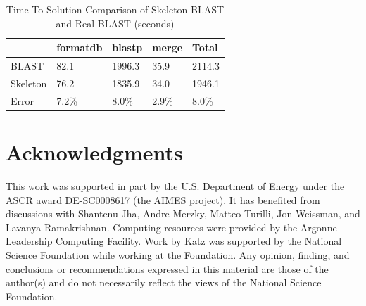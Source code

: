 \documentclass{sig-alternate}
\newcommand{\up}{\vspace*{-1em}}
\begin{document}
\begin{table}[t]
\begin{center}
    \caption{Time-To-Solution Comparison of Skeleton BLAST and Real BLAST (seconds)}
    \begin{scriptsize}
    \begin{tabular}{ | p{1cm} | p{1cm} | p{1cm} | p{1.2cm} | p{1cm} | }
    \hline
	& formatdb & blastp & merge & Total \\ \hline \hline
	BLAST & 82.1 & 1996.3 & 35.9 & 2114.3 \\ \hline
	Skeleton & 76.2 & 1835.9& 34.0 & 1946.1 \\ \hline
	Error & 7.2\% & 8.0\% & 2.9\% & 8.0\% \\ \hline
    \end{tabular}
    \end{scriptsize}
    \label{tb:blast-results}
    \up
\end{center}   
\end{table}

\section*{Acknowledgments}

This work was supported in part by the U.S. Department of Energy 
under the ASCR award DE-SC0008617 (the AIMES project).
It has benefited from discussions with Shantenu Jha, Andre Merzky, Matteo Turilli, Jon Weissman, and Lavanya Ramakrishnan.
Computing resources were provided by the
Argonne Leadership Computing Facility. Work by Katz was supported by 
the National Science Foundation while working at the Foundation.  Any 
opinion, finding, and conclusions or recommendations expressed in this
 material are those of the author(s) and do not necessarily reflect 
 the views of the National Science Foundation.
 



\end{document}
